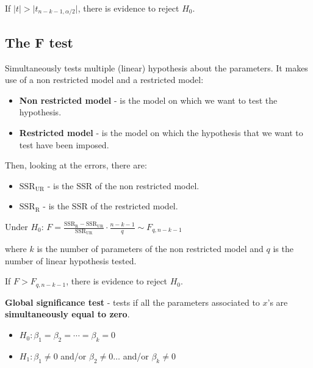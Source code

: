 \documentclass[10pt, a4paper, landscape]{article}
\newcommand{\SSR}{\text{SSR}}
\begin{document}
\begin{multicols}{3}
If \( \lvert t \rvert > \lvert t_{n - k - 1, \alpha / 2} \rvert \), there is evidence to reject \( H_{0} \).

\subsection*{The F test}

Simultaneously tests multiple (linear) hypothesis about the parameters. It makes use of a non restricted model and a restricted model:

\begin{itemize}[leftmargin=*]
	\item \textbf{Non restricted model} - is the model on which we want to test the hypothesis.
	\item \textbf{Restricted model} - is the model on which the hypothesis that we want to test have been imposed.
\end{itemize}

Then, looking at the errors, there are:

\begin{itemize}[leftmargin=*]
	\item \textbf{\( \SSR_{\text{UR}} \)} - is the \( \SSR \) of the non restricted model.
	\item \textbf{\( \SSR_{\text{R}} \)} - is the \( \SSR \) of the restricted model.
\end{itemize}

\begin{center}
	Under \( H_{0} \): \quad \( F = \frac{\SSR_{\text{R}} - \SSR_{\text{UR}}}{\SSR_{\text{UR}}} \cdot \frac{n - k - 1}{q} \sim F_{q, n - k - 1} \)
\end{center}

where \( k \) is the number of parameters of the non restricted model and \( q \) is the number of linear hypothesis tested.

If \( F > F_{q, n - k - 1} \), there is evidence to reject \( H_{0} \).

\textbf{Global significance test} - tests if all the parameters associated to \( x \)'s are \textbf{simultaneously equal to zero}.

\begin{itemize}[leftmargin=*]
	\item \( H_{0}: \beta_{1} = \beta_{2} = \cdots = \beta_{k} = 0 \)
	\item \( H_{1}: \beta_{1} \neq 0 \) and/or \( \beta_{2} \neq 0 \ldots \) and/or \( \beta_{k} \neq 0 \)
\end{itemize}


\end{multicols}
\end{document}
